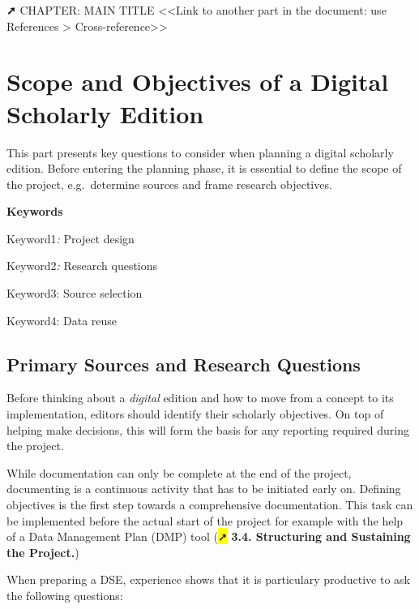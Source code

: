 \documentclass[
  letterpaper,
  DIV=11,
  numbers=noendperiod]{scrreprt}
\begin{document}
\textbf{➚} CHAPTER: MAIN TITLE \textless\textless Link to another part
in the document: use References \textgreater{}
Cross-reference\textgreater\textgreater{}

\section{Scope and Objectives of a Digital Scholarly
Edition}\label{scope-and-objectives-of-a-digital-scholarly-edition}

This part presents key questions to consider when planning a digital
scholarly edition. Before entering the planning phase, it is essential
to define the scope of the project, e.g.~determine sources and frame
research objectives.

\textbf{Keywords}

Keyword1\emph{:} Project design

Keyword2\emph{:} Research questions

Keyword3: Source selection

Keyword4: Data reuse

\subsection{Primary Sources and Research
Questions}\label{primary-sources-and-research-questions}

Before thinking about a \emph{digital} edition and how to move from a
concept to its implementation, editors should identify their scholarly
objectives. On top of helping make decisions, this will form the basis
for any reporting required during the project.

While documentation can only be complete at the end of the project,
documenting is a continuous activity that has to be initiated early on.
Defining objectives is the first step towards a comprehensive
documentation. This task can be implemented before the actual start of
the project for example with the help of a Data Management Plan (DMP)
tool (\hl{➚} \textbf{3.4. Structuring and Sustaining the Project.})

When preparing a DSE, experience shows that it is particulary productive
to ask the following questions:
\end{document}
